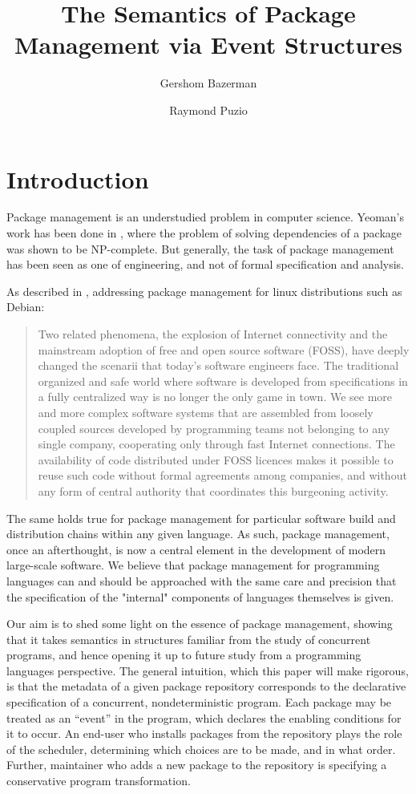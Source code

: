 \documentclass[hoptionsi,review,screen,format=sigconf]{acmart}
\title{The Semantics of Package Management via Event Structures}
\author{Gershom Bazerman}
\affiliation{%
   \institution{Awake Security}}
\author{Raymond Puzio}
\affiliation{%
   \institution{Albert Einstein Institute}}
\theoremstyle{definition}
\begin{document}
\maketitle

\section{Introduction}
Package management is an understudied problem in computer science. Yeoman's work has been done in \cite{di2006edos, abate2012dependency}, where the problem of solving dependencies of a package was shown to be NP-complete. But generally, the task of package management has been seen as one of engineering, and not of formal specification and analysis. 

As described in \cite{abate2012dependency}, addressing package management for linux distributions such as Debian:
\begin{quotation}
Two related phenomena, the explosion of Internet connectivity and the mainstream adoption of free and open source software (FOSS), have deeply changed the scenarii that today’s software engineers face. The traditional organized and safe world where software is developed from specifications in a fully centralized way is no longer the only game in town. We see more and more complex software systems that are assembled from loosely coupled sources developed by programming teams not belonging to any single company, cooperating only through fast Internet connections. The availability of code distributed under FOSS licences makes it possible to reuse such code without formal agreements among companies, and without any form of central authority that coordinates this burgeoning activity.
\end{quotation}

The same holds true for package management for particular software build and distribution chains within any given language. As such, package management, once an afterthought, is now a central element in the development of modern large-scale software. We believe that package management for programming languages can and should be approached with the same care and precision that the specification of the "internal" components of languages themselves is given.

Our aim is to shed some light on the essence of package management, showing that it takes semantics in structures familiar from the study of concurrent programs, and hence opening it up to future study from a programming languages perspective. The general intuition, which this paper will make rigorous, is that the metadata of a given package repository corresponds to the declarative specification of a concurrent, nondeterministic program. Each package may be treated as an ``event'' in the program, which declares the enabling conditions for it to occur. An end-user who installs packages from the repository plays the role of the scheduler, determining which choices are to be made, and in what order. Further, maintainer who adds a new  package to the repository is specifying a conservative program transformation.
\end{document}
